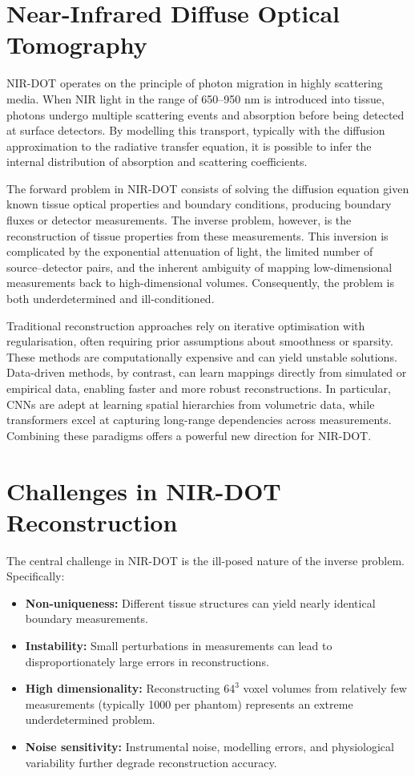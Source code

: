 \section{Near-Infrared Diffuse Optical Tomography}

NIR-DOT operates on the principle of photon migration in highly scattering media. When NIR light in the range of 650–950 nm is introduced into tissue, photons undergo multiple scattering events and absorption before being detected at surface detectors. By modelling this transport, typically with the diffusion approximation to the radiative transfer equation, it is possible to infer the internal distribution of absorption and scattering coefficients.

The forward problem in NIR-DOT consists of solving the diffusion equation given known tissue optical properties and boundary conditions, producing boundary fluxes or detector measurements. The inverse problem, however, is the reconstruction of tissue properties from these measurements. This inversion is complicated by the exponential attenuation of light, the limited number of source–detector pairs, and the inherent ambiguity of mapping low-dimensional measurements back to high-dimensional volumes. Consequently, the problem is both underdetermined and ill-conditioned.

Traditional reconstruction approaches rely on iterative optimisation with regularisation, often requiring prior assumptions about smoothness or sparsity. These methods are computationally expensive and can yield unstable solutions. Data-driven methods, by contrast, can learn mappings directly from simulated or empirical data, enabling faster and more robust reconstructions. In particular, CNNs are adept at learning spatial hierarchies from volumetric data, while transformers excel at capturing long-range dependencies across measurements. Combining these paradigms offers a powerful new direction for NIR-DOT.

\section{Challenges in NIR-DOT Reconstruction}

The central challenge in NIR-DOT is the ill-posed nature of the inverse problem. Specifically:

\begin{itemize}
    \item \textbf{Non-uniqueness:} Different tissue structures can yield nearly identical boundary measurements.
    \item \textbf{Instability:} Small perturbations in measurements can lead to disproportionately large errors in reconstructions.
    \item \textbf{High dimensionality:} Reconstructing $64^3$ voxel volumes from relatively few measurements (typically 1000 per phantom) represents an extreme underdetermined problem.
    \item \textbf{Noise sensitivity:} Instrumental noise, modelling errors, and physiological variability further degrade reconstruction accuracy.
\end{itemize}

